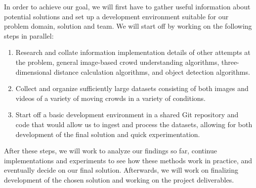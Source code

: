 \documentclass{scrartcl}
\begin{document}
In order to achieve our goal, 
we will first have to gather useful information about potential solutions
and set up a development environment suitable for our problem domain, solution and team.
We will start off by working on the following steps in parallel:
\begin{enumerate}
    \item Research and collate information implementation details of other attempts at the problem, general image-based crowd understanding algorithms, three-dimensional distance calculation algorithms, and object detection algorithms.
    \item Collect and organize sufficiently large datasets consisting 
    of both images and videos of a variety of moving crowds in a variety of conditions.
    \item Start off a basic development environment in a shared Git repository and code that would allow us 
    to ingest and process the datasets, allowing for both
    development of the final solution and quick experimentation.
\end{enumerate}

After these steps,
we will work to analyze our findings so far, continue implementations and experiments 
to see how these methods work in practice, and eventually decide on our final solution. 
Afterwards, we will work on finalizing development of the chosen solution and working on the project deliverables.

\printbibliography
\end{document}
